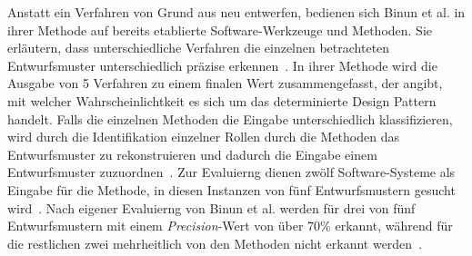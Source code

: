 Anstatt ein Verfahren von Grund aus neu entwerfen, bedienen sich Binun et al. in ihrer Methode auf bereits etablierte Software-Werkzeuge und Methoden.
Sie erläutern, dass unterschiedliche Verfahren die einzelnen betrachteten Entwurfsmuster unterschiedlich präzise erkennen~\cite[S.15 - 17]{binun2009}.
In ihrer Methode wird die Ausgabe von 5 Verfahren zu einem finalen Wert zusammengefasst, der angibt, mit welcher Wahrscheinlichtkeit es sich um das determinierte Design Pattern handelt.
Falls die einzelnen Methoden die Eingabe unterschiedlich klassifizieren, wird durch die Identifikation einzelner Rollen durch die Methoden das Entwurfsmuster zu rekonstruieren und dadurch die Eingabe einem Entwurfsmuster zuzuordnen~\cite[S. 15 - 16]{binun2009}.
Zur Evaluierng dienen zwölf Software-Systeme als Eingabe für die Methode, in diesen Instanzen von fünf Entwurfsmustern gesucht wird~\cite[S. 9, S. 23]{binun2009}.
Nach eigener Evaluierng von Binun et al. werden für drei von fünf Entwurfsmustern mit einem \textit{Precision}-Wert von über 70\% erkannt, während für die restlichen zwei mehrheitlich von den Methoden nicht erkannt werden~\cite[S. 22]{binun2009}.

